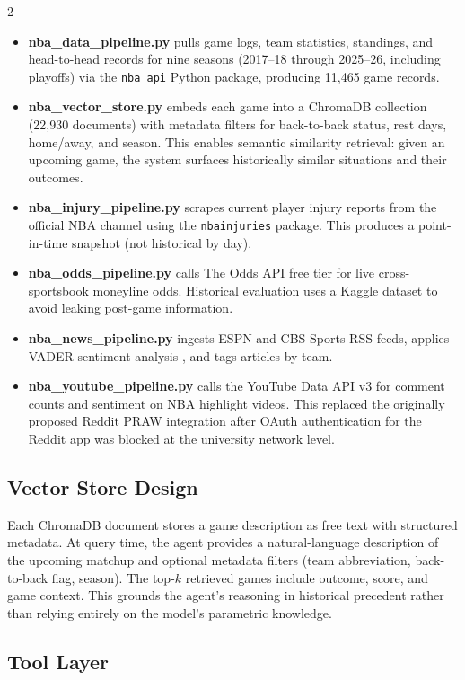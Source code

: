 \documentclass[11pt]{article}
\begin{document}
\begin{multicols}{2}
\begin{itemize}[leftmargin=*]
    \item \textbf{nba\_data\_pipeline.py} pulls game logs, team statistics, standings, and head-to-head records for nine seasons (2017--18 through 2025--26, including playoffs) via the \texttt{nba\_api} Python package, producing 11,465 game records.
    \item \textbf{nba\_vector\_store.py} embeds each game into a ChromaDB collection (22,930 documents) with metadata filters for back-to-back status, rest days, home/away, and season. This enables semantic similarity retrieval: given an upcoming game, the system surfaces historically similar situations and their outcomes.
    \item \textbf{nba\_injury\_pipeline.py} scrapes current player injury reports from the official NBA channel using the \texttt{nbainjuries} package. This produces a point-in-time snapshot (not historical by day).
    \item \textbf{nba\_odds\_pipeline.py} calls The Odds API free tier for live cross-sportsbook moneyline odds. Historical evaluation uses a Kaggle dataset \citep{qiu2024} to avoid leaking post-game information.
    \item \textbf{nba\_news\_pipeline.py} ingests ESPN and CBS Sports RSS feeds, applies VADER sentiment analysis \citep{hutto2014}, and tags articles by team.
    \item \textbf{nba\_youtube\_pipeline.py} calls the YouTube Data API v3 for comment counts and sentiment on NBA highlight videos. This replaced the originally proposed Reddit PRAW integration after OAuth authentication for the Reddit app was blocked at the university network level.
\end{itemize}

\subsection{Vector Store Design}

Each ChromaDB document stores a game description as free text with structured metadata. At query time, the agent provides a natural-language description of the upcoming matchup and optional metadata filters (team abbreviation, back-to-back flag, season). The top-$k$ retrieved games include outcome, score, and game context. This grounds the agent's reasoning in historical precedent rather than relying entirely on the model's parametric knowledge.

\subsection{Tool Layer}


\end{multicols}
\end{document}
